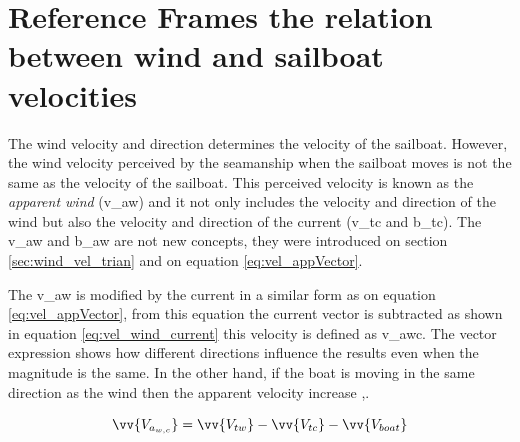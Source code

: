 \section{Reference Frames the relation between wind and sailboat velocities}

The wind velocity and direction determines the velocity of the sailboat. However, the wind velocity perceived by the seamanship when the sailboat moves is not the same as the velocity of the sailboat. This perceived velocity is known as the \textit{apparent wind} (\acrshort{v_aw}) and it not only includes the velocity and direction of the wind but also the velocity and direction of the current (\acrshort{v_tc} and \acrshort{b_tc}). The \acrshort{v_aw} and \acrshort{b_aw} are not new concepts, they were introduced on section \ref{sec:wind_vel_trian} and on equation \ref{eq:vel_appVector}. \par

The \acrshort{v_aw} is modified by the current in a similar form as on equation \ref{eq:vel_appVector}, from this equation the current vector is subtracted as shown in equation \ref{eq:vel_wind_current} this velocity is defined as \acrshort{v_awc}. The vector expression shows how different directions influence the results even when the magnitude is the same. In the other hand, if the boat is moving in the same direction as the wind then the apparent velocity increase \cite{denny2009float},\cite{allsopp1998stochastic}. \par 

\begin{equation} \label{eq:vel_wind_current}
\vv{V_{a_{w,c}}}= \vv{V_{tw}} -\vv{V_{tc}} - \vv{V_{boat}}
\end{equation}


